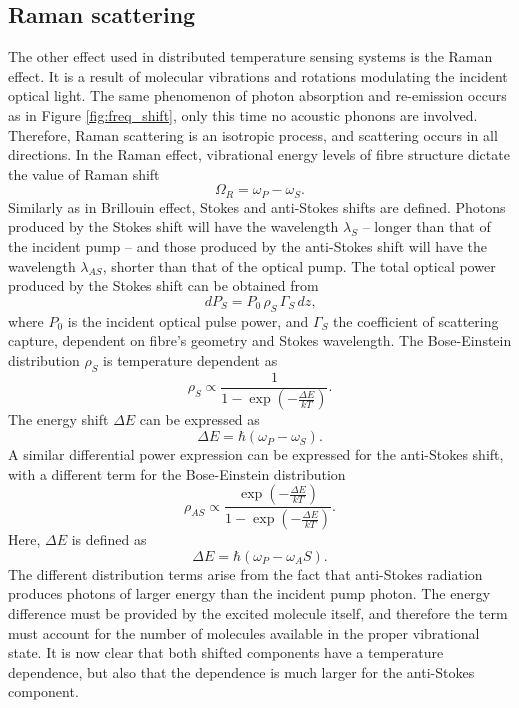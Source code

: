 \documentclass{standalone}
\begin{document}
\subsection{Raman scattering}
The other effect used in distributed temperature sensing systems is the Raman effect. It is a result of molecular vibrations and rotations modulating the incident optical light. The same phenomenon of photon absorption and re-emission occurs as in Figure \ref{fig:freq_shift}, only this time no acoustic phonons are involved. Therefore, Raman scattering is an isotropic process, and scattering occurs in all directions. In the Raman effect, vibrational energy levels of fibre structure dictate the value of Raman shift
\begin{equation}
\Omega_R = \omega_P - \omega_S \textrm{.}
\end{equation}
Similarly as in Brillouin effect, Stokes and anti-Stokes shifts are defined. Photons produced by the Stokes shift will have the wavelength $\lambda_S$ -- longer than that of the incident pump -- and those produced by the anti-Stokes shift will have the wavelength $\lambda_{AS}$, shorter than that of the optical pump. The total optical power produced by the Stokes shift can be obtained from 
\begin{equation} \label{eq:raman_beer}
dP_S = P_0 \, \rho_S \, \Gamma_S \, dz \textrm{,}
\end{equation}
where $P_0$ is the incident optical pulse power, and $\Gamma_S$ the coefficient of scattering capture, dependent on fibre's geometry and Stokes wavelength. The Bose-Einstein distribution $\rho_S$ is temperature dependent as
\begin{equation} \label{eq:be-s}
\rho_S \propto \frac{1}{1- \exp\left( - \frac{\varDelta E}{k T} \right)} \textrm{.}
\end{equation}
The energy shift $\varDelta E$ can be expressed as
\begin{equation}
\varDelta E = \hbar \left( \omega_P - \omega_S \right) \textrm{.}
\end{equation}
A similar differential power expression can be expressed for the anti-Stokes shift, with a different term for the Bose-Einstein distribution
\begin{equation} \label{eq:be-as}
\rho_{AS} \propto \frac{\exp\left( - \frac{\varDelta E}{k T} \right)}{1 - \exp\left( - \frac{\varDelta E}{k T} \right)} \textrm{.}
\end{equation}
Here, $\varDelta E$ is defined as
\begin{equation}
\varDelta E = \hbar \left( \omega_P - \omega_AS \right) \textrm{.}
\end{equation}
The different distribution terms arise from the fact that anti-Stokes radiation produces photons of larger energy than the incident pump photon. The energy difference must be provided by the excited molecule itself, and therefore the term must account for the number of molecules available in the proper vibrational state. It is now clear that both shifted components have a temperature dependence, but also that the dependence is much larger for the anti-Stokes component. \\
\end{document}
